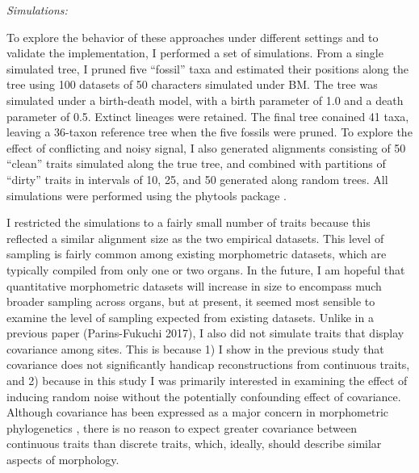 \documentclass[12pt]{article}
\begin{document}
\noindent\emph{Simulations:}

To explore the behavior of these approaches under different settings and
to validate the implementation, I performed a set of simulations. From a
single simulated tree, I pruned five ``fossil'' taxa and
estimated their positions along the tree using 100 datasets of 50
characters simulated under BM. The tree was simulated under a
birth-death model, with a birth parameter of 1.0 and a death parameter
of 0.5. Extinct lineages were retained. The final tree conained 41 taxa,
leaving a 36-taxon reference tree when the five fossils were pruned. To
explore the effect of conflicting and noisy signal, I also generated
alignments consisting of 50 ``clean'' traits simulated along the true
tree, and combined with partitions of ``dirty'' traits in intervals of
10, 25, and 50 generated along random trees. All simulations were
performed using the phytools package \citep{revell2012phytools}.

I restricted the simulations to a fairly small number of traits because
this reflected a similar alignment size as the two empirical datasets.
This level of sampling is fairly common among existing morphometric
datasets, which are typically compiled from only one or two organs. In
the future, I am hopeful that quantitative morphometric datasets will
increase in size to encompass much broader sampling across organs, but
at present, it seemed most sensible to examine the level of sampling
expected from existing datasets. Unlike in a previous paper
(Parins-Fukuchi 2017), I also did not simulate traits that display
covariance among sites. This is because 1) I show in the previous study
that covariance does not significantly handicap reconstructions from
continuous traits, and 2) because in this study I was primarily
interested in examining the effect of inducing random noise without the
potentially confounding effect of covariance. Although covariance has
been expressed as a major concern in morphometric phylogenetics
\citep{felsenstein1988phylogenies,felsenstein2002quantitative}, there is no reason to expect greater
covariance between continuous traits than discrete traits, which,
ideally, should describe similar aspects of morphology.
\end{document}
